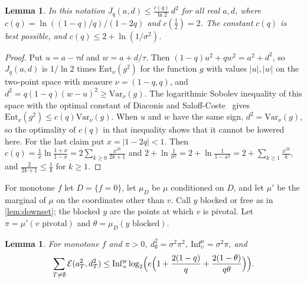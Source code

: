 \documentclass[11pt]{amsart}
\newtheorem{lemma}[theorem]{Lemma}
\theoremstyle{remark}
\newcommand{\Inf}{\mathrm{Inf}}
\newcommand{\Var}{\mathrm{Var}}
\begin{document}
\begin{lemma}\label{lem:biasedjs}
In this notation $J_q(a,d)\le\frac{c(q)}{\ln2}\,d^2$ for all real $a,d$, where $c(q)=\ln((1-q)/q)/(1-2q)$ and
$c(\frac12)=2$. The constant $c(q)$ is best possible, and $c(q)\le2+\ln(1/\sigma^2)$.
\end{lemma}

\begin{proof}
Put $u=a-\tau d$ and $w=a+d/\tau$. Then $(1-q)u^2+qw^2=a^2+d^2$, so $J_q(a,d)$ is $1/\ln2$ times $\mathrm{Ent}_\nu(g^2)$
for the function $g$ with values $|u|,|w|$ on the two-point space with measure $\nu=(1-q,q)$, and
$d^2=q(1-q)(w-u)^2\ge\Var_\nu(g)$. The logarithmic Sobolev inequality of this space with the optimal constant of
Diaconis and Saloff-Coste~\cite[Theorem~A.1]{DSC96} gives $\mathrm{Ent}_\nu(g^2)\le c(q)\Var_\nu(g)$. When $u$ and $w$
have the same sign, $d^2=\Var_\nu(g)$, so the optimality of $c(q)$ in that inequality shows that it cannot be lowered
here. For the last claim put $x=|1-2q|<1$. Then $c(q)=\frac1x\ln\frac{1+x}{1-x}=2\sum_{k\ge0}\frac{x^{2k}}{2k+1}$ and
$2+\ln\frac1{\sigma^2}=2+\ln\frac1{1-x^2}=2+\sum_{k\ge1}\frac{x^{2k}}k$, and $\frac2{2k+1}\le\frac1k$ for $k\ge1$.
\end{proof}

For monotone $f$ let $D=\{f=0\}$, let $\mu_D$ be $\mu$ conditioned on $D$, and let $\mu'$ be the marginal of $\mu$ on
the coordinates other than $v$. Call $y$ blocked or free as in \cref{lem:downset}; the blocked $y$ are the points at which
$v$ is pivotal. Let $\pi=\mu'(v\text{ pivotal})$ and $\theta=\mu_D(y\text{ blocked})$.

\begin{lemma}\label{lem:biasederasure}
For monotone $f$ and $\pi>0$, $d_\emptyset^2=\sigma^2\pi^2$, $\Inf^\mu_v=\sigma^2\pi$, and
\[
\sum_{T\neq\emptyset}\mathcal E(a_T^2,d_T^2)\le\Inf^\mu_v\log_2\Bigl(e\Bigl(1+\frac{2(1-q)}q+\frac{2(1-\theta)}{q\theta}\Bigr)\Bigr).
\]
\end{lemma}
\end{document}
